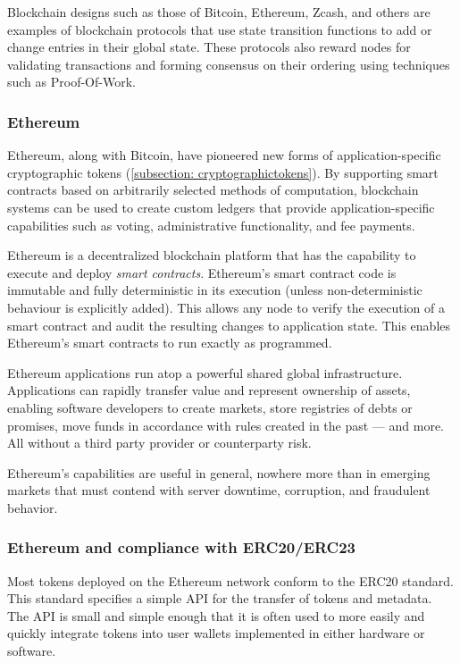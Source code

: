 Blockchain designs such as those of Bitcoin, Ethereum, Zcash, and others are examples of blockchain protocols that use state transition functions to add or change entries in their global state. These protocols also reward nodes for validating transactions and forming consensus on their ordering using techniques such as Proof-Of-Work\cite{44}.

\subsubsection{Ethereum}
Ethereum\cite{31}, along with Bitcoin, have pioneered new forms of application-specific cryptographic tokens (\ref{subsection: cryptographictokens}). By supporting smart contracts based on arbitrarily selected methods of computation, blockchain systems can be used to create custom ledgers that provide application-specific capabilities such as voting, administrative functionality, and fee payments.

Ethereum\cite{29} is a decentralized blockchain platform that has the capability to execute and deploy \textit{smart contracts}. Ethereum's smart contract code is immutable and fully deterministic in its execution (unless non-deterministic behaviour is explicitly added). This allows any node to verify the execution of a smart contract and audit the resulting changes to application state. This enables Ethereum's smart contracts to run exactly as programmed.

Ethereum applications run atop a powerful shared global infrastructure. Applications can rapidly transfer value and represent ownership of assets, enabling software developers to create markets, store registries of debts or promises, move funds in accordance with rules created in the past — and more. All without a third party provider or counterparty risk.

Ethereum's capabilities are useful in general, nowhere more than in emerging markets that must contend with server downtime, corruption, and fraudulent behavior.

\subsubsection{Ethereum and \tOM{} compliance with ERC20/ERC23}
Most tokens deployed on the Ethereum network conform to the ERC20 standard\cite{38}. This standard specifies a simple API for the transfer of tokens and metadata. The API is small and simple enough that it is often used to more easily and quickly integrate tokens into user wallets implemented in either hardware or software.

